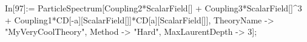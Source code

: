 In[97]:= ParticleSpectrum[Coupling2*ScalarField[] + Coupling3*ScalarField[]^3 + Coupling1*CD[-a][ScalarField[]]*CD[a][ScalarField[]], TheoryName -> "MyVeryCoolTheory", Method -> "Hard", MaxLaurentDepth -> 3]; 